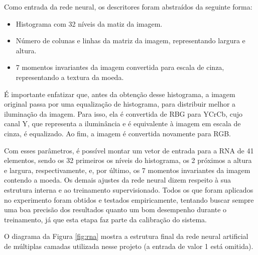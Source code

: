 \documentclass[10pt,journal,compsoc]{IEEEtran}
\begin{document}
Como entrada da rede neural, os descritores foram abstraídos da seguinte forma:

\begin{itemize}  
\item Histograma com 32 níveis da matiz da imagem.
\item Número de colunas e linhas da matriz da imagem, representando largura e altura.
\item 7 momentos invariantes da imagem convertida para escala de cinza, representando a textura da moeda.
\end{itemize}

É importante enfatizar que, antes da obtenção desse histograma, a imagem original passa por uma equalização de histograma, para distribuir melhor a iluminação da imagem. Para isso, ela é convertida de RBG para YCrCb, cujo canal Y, que representa a iluminância e é equivalente à imagem em escala de cinza, é equalizado. Ao fim, a imagem é convertida novamente para RGB. 

Com esses parâmetros, é possível montar um vetor de entrada para a RNA  de 41 elementos, sendo os 32 primeiros os níveis do histograma, os 2 próximos a altura e largura, respectivamente, e, por último, os 7 momentos invariantes da imagem contendo a moeda. Os demais ajustes da rede neural dizem respeito à sua estrutura interna e ao treinamento supervisionado. Todos os que foram aplicados no experimento foram obtidos e testados empiricamente, tentando buscar sempre uma boa precisão dos resultados quanto um bom desempenho durante o treinamento, já que esta etapa faz parte da calibração do sistema.

O diagrama da Figura \ref{fig:rna} mostra a estrutura final da rede neural artificial de múltiplas camadas utilizada nesse projeto (a entrada de valor 1 está omitida).

\end{document}
